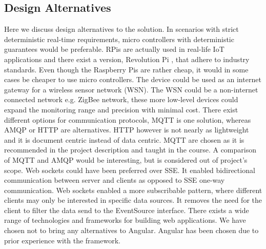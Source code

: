 \subsection*{Design Alternatives}
Here we discuss design alternatives to the solution. In scenarios with strict deterministic real-time requirements, micro controllers with deterministic guarantees would be preferable. RPis are actually used in real-life IoT applications and there exist a version, Revolution Pi \cite{revolution}, that adhere to industry standards. Even though the Raspberry Pis are rather cheap, it would in some cases be cheaper to use micro controllers.
The device could be used as an internet gateway for a wireless sensor network (WSN). The WSN could be a non-internet connected network e.g. ZigBee network, these more low-level devices could expand the monitoring range and precision with minimal cost. 
There exist different options for communication protocols, MQTT is one solution, whereas AMQP or HTTP are alternatives. HTTP however is not nearly as lightweight and it is document centric instead of data centric. MQTT are chosen as it is recommended in the project description and taught in the course. A comparison of MQTT and AMQP would be interesting, but is considered out of project's scope.
Web sockets could have been preferred over SSE. It enabled bidirectional communication between server and clients as opposed to SSE one-way communication. Web sockets enabled a more subscribable pattern, where different clients may only be interested in specific data sources. It removes the need for the client to filter the data send to the EventSource interface.
There exists a wide range of technologies and frameworks for building web applications. We have chosen not to bring any alternatives to Angular. Angular has been chosen due to prior experience with the framework. 
